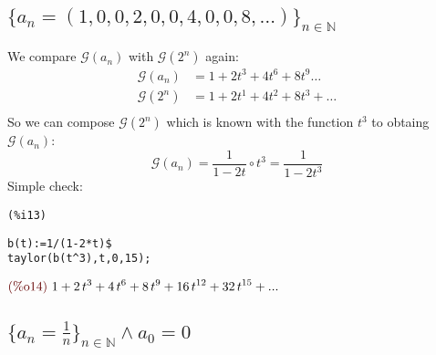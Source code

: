 \subsection{$\{a_n = (1,0,0,2,0,0,4,0,0,8,\ldots)\}_{n\in \mathbb{N} }$}

We compare $\mathcal{G}(a_n) $ with $\mathcal{G} (2^n)$ again:
\begin{displaymath}
  \begin{split}
    \mathcal{G} (a_n) &= 1 + 2t^3 + 4t^6 + 8t^9\ldots \\
    \mathcal{G} (2^n) &= 1 + 2t^1 + 4t^2 + 8t^3 + \ldots \\
  \end{split}
\end{displaymath}
So we can compose $\mathcal{G} (2^n)$ which is known with the function
$t^3$ to obtaing $\mathcal{G} (a_n)$:
\begin{displaymath}
  \mathcal{G} (a_n) =  \frac{1}{1-2t} \circ t^3 =  \frac{1}{1-2t^3} 
\end{displaymath}
Simple check:

\noindent
\begin{minipage}[t]{8ex}{\color{red}\bf
\begin{verbatim}
(%i13) 
\end{verbatim}}
\end{minipage}
\begin{minipage}[t]{\textwidth}{\color{blue}
\begin{verbatim}
b(t):=1/(1-2*t)$
taylor(b(t^3),t,0,15);
\end{verbatim}}
\end{minipage}
\begin{math}\displaystyle
\parbox{8ex}{\color{labelcolor}(\%o14) }
1+2\,{t}^{3}+4\,{t}^{6}+8\,{t}^{9}+16\,{t}^{12}+32\,{t}^{15}+...
\end{math}

\subsection{$\{a_n =  \frac{1}{n} \}_{n\in \mathbb{N} } \wedge a_0 = 0$}

